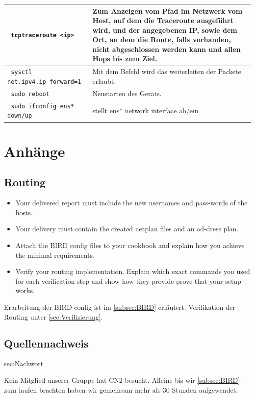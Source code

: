 \documentclass[11pt,titlepage]{article}
\newenvironment{shadedquotation}
 {\begin{shaded*}
  \quoting[leftmargin=0pt, vskip=0pt]
 }
 {\endquoting
 \end{shaded*}
}
\begin{document}
\begin{tabular}{ |p{4cm}|p{10cm}|}
  \hline
  \lstinline! tcptraceroute <ip> ! & Zum Anzeigen vom Pfad im Netzwerk vom Host, auf dem die Traceroute ausgeführt wird, und der angegebenen IP, sowie dem Ort, an dem die Route, falls vorhanden, nicht abgeschlossen werden kann und allen Hops bis zum Ziel. \\
  \hline
  \lstinline! sysctl net.ipv4.ip_forward=1 ! & Mit dem Befehl wird das weiterleiten der Packete erlaubt. \\
  \hline
  \lstinline! sudo reboot ! & Neustarten des Geräts. \\ 
  \hline
  \lstinline! sudo ifconfig ens* down/up ! & stellt ens* network interface ab/ein\\
  \hline
\end{tabular}

\section{Anhänge}
\label{sec:Anhänge}

\subsection{Routing}
\label{subsec:Routing}
\begin{shadedquotation}
  \begin{itemize}
    \item Your delivered report must include the new usernames and pass-words of the hosts.
    \item Your delivery must contain the created netplan files and an ad-dress plan.
    \item Attach the BIRD config files to your cookbook and explain how you achieve the minimal requirements.
    \item Verify your routing implementation. Explain which exact commands you used for each verification step and show how they provide prove that your setup works.
  \end{itemize}
\end{shadedquotation}
Erarbeitung der BIRD-config ist im \ref{subsec:BIRD} erläutert.
Verifikation der Routing unter \ref{sec:Verifizierung}.

\subsection{Quellennachweis}
\label{subsec:Quellennachweis}

\begingroup
\renewcommand{\section}[2]{}%


\endgroup  

\section{Nachwort}
\label{sec:Nachwort}

Kein Mitglied unserer Gruppe hat CN2 besucht. Alleine bis wir \ref{subsec:BIRD} zum laufen brachten haben wir gemeinsam mehr als 30 Stunden aufgewendet. 
\end{document}
